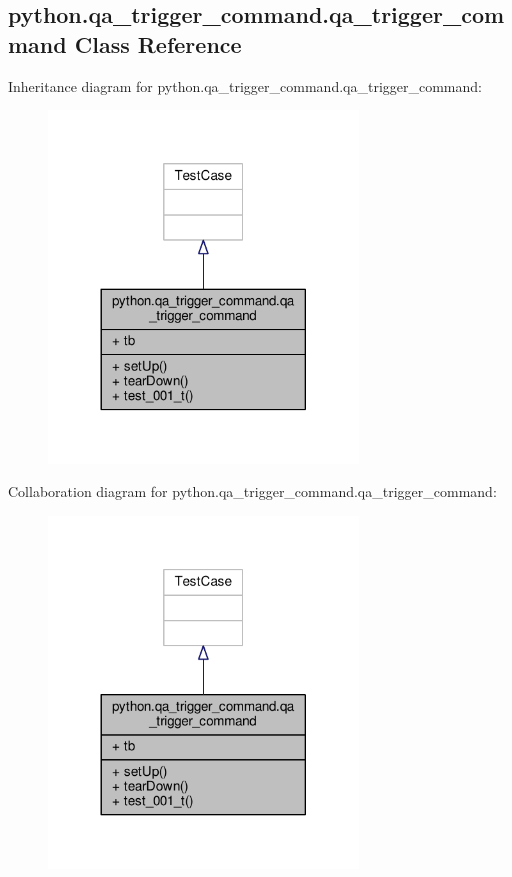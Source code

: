 \subsection{python.\+qa\+\_\+trigger\+\_\+command.\+qa\+\_\+trigger\+\_\+command Class Reference}
\label{classpython_1_1qa__trigger__command_1_1qa__trigger__command}


Inheritance diagram for python.\+qa\+\_\+trigger\+\_\+command.\+qa\+\_\+trigger\+\_\+command\+:
\nopagebreak
\begin{figure}[H]
\begin{center}
\leavevmode
\includegraphics[width=233pt]{dd/dea/classpython_1_1qa__trigger__command_1_1qa__trigger__command__inherit__graph}
\end{center}
\end{figure}


Collaboration diagram for python.\+qa\+\_\+trigger\+\_\+command.\+qa\+\_\+trigger\+\_\+command\+:
\nopagebreak
\begin{figure}[H]
\begin{center}
\leavevmode
\includegraphics[width=233pt]{dd/d23/classpython_1_1qa__trigger__command_1_1qa__trigger__command__coll__graph}
\end{center}
\end{figure}

